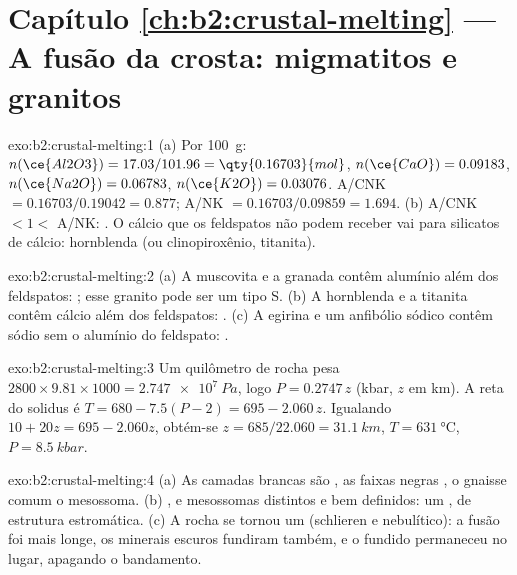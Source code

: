 \section*{Capítulo \ref{ch:b2:crustal-melting} --- A fusão da crosta: migmatitos e granitos}

\begin{solution}{exo:b2:crustal-melting:1}
(a) Por \qty{100}{\gram}: $n(\ce{Al2O3}) = 17.03/101.96 = \qty{0.16703}{mol}$,
$n(\ce{CaO}) = 0.09183$, $n(\ce{Na2O}) = 0.06783$, $n(\ce{K2O}) = 0.03076$.
A/CNK $= 0.16703/0.19042 = 0.877$; A/NK $= 0.16703/0.09859 = 1.694$.
(b) A/CNK $< 1 <$ A/NK: . O cálcio que os feldspatos não podem receber vai para
silicatos de cálcio: hornblenda (ou clinopiroxênio, titanita).
\end{solution}

\begin{solution}{exo:b2:crustal-melting:2}
(a) A muscovita e a granada contêm alumínio além dos feldspatos: ; esse granito
pode ser um tipo S. (b) A hornblenda e a titanita contêm cálcio além dos feldspatos:
. (c) A egirina e um anfibólio sódico contêm sódio sem o alumínio
do feldspato: .
\end{solution}

\begin{solution}{exo:b2:crustal-melting:3}
Um quilômetro de rocha pesa $2800\times9.81\times1000 = \qty{2.747e7}{Pa}$, logo
$P = 0.2747\,z$ (\unit{kbar}, $z$ em \unit{km}). A reta do solidus é $T = 680 - 7.5(P -
2) = 695 - 2.060\,z$. Igualando $10 + 20z = 695 - 2.060z$, obtém-se $z = 685/22.060 =
\qty{31.1}{km}$, $T = \qty{631}{\celsius}$, $P = \qty{8.5}{kbar}$.
\end{solution}

\begin{solution}{exo:b2:crustal-melting:4}
(a) As camadas brancas são , as faixas negras , o gnaisse comum o
mesossoma. (b) ,  e mesossomas distintos e bem definidos: um ,
de estrutura estromática. (c) A rocha se tornou um  (schlieren e nebulítico):
a fusão foi mais longe, os minerais escuros fundiram também, e o fundido permaneceu no lugar,
apagando o bandamento.
\end{solution}

